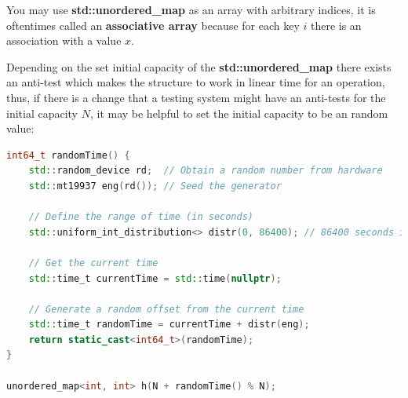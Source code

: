 You may use \textbf{std::unordered\_map} as an array with arbitrary indices, it is oftentimes called an \textbf{associative array} because for each key $i$ there is an association with a value $x$.

Depending on the set initial capacity of the \textbf{std::unordered\_map} there exists an anti-test which makes the structure to work in linear time for an operation, thus, if there is a change that a testing system might have an anti-tests for the initial capacity $N$, it may be helpful to set the initial capacity to be an random value:

\begin{lstlisting}[language=C++]
int64_t randomTime() {
    std::random_device rd;  // Obtain a random number from hardware
    std::mt19937 eng(rd()); // Seed the generator

    // Define the range of time (in seconds)
    std::uniform_int_distribution<> distr(0, 86400); // 86400 seconds in a day

    // Get the current time
    std::time_t currentTime = std::time(nullptr);

    // Generate a random offset from the current time
    std::time_t randomTime = currentTime + distr(eng);
    return static_cast<int64_t>(randomTime);
}

unordered_map<int, int> h(N + randomTime() % N);
\end{lstlisting}